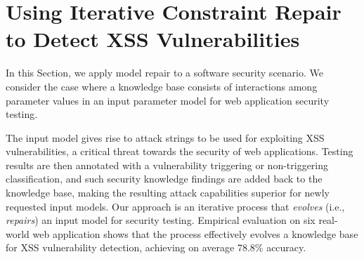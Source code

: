 \begin{tikzborder}{\cite{Gargantini16:validation}}
\begin{tikzborder}{\cite{gargantini_combinatorial_2017}}
\begin{tikzborder}{\cite{gargantini_combinatorial_2017}}
\section{Using Iterative Constraint Repair to Detect XSS Vulnerabilities}\label{sec:garn2019}

In this Section, we apply model repair to a software security scenario. 
We consider the case where a knowledge base consists of interactions among parameter values in an input parameter model for web application security testing.

The input model gives rise to attack strings to be used for exploiting XSS vulnerabilities, a critical threat towards the security of web applications.
Testing results are then annotated with a vulnerability triggering or non-triggering classification, and such security knowledge findings are added back to the knowledge base, making the resulting attack capabilities superior for newly requested input models.
Our approach is an iterative process that \textit{evolves} (i.e., \textit{repairs}) an input model for security testing.
Empirical evaluation on six real-world web application shows that the process effectively evolves a knowledge base for XSS vulnerability detection, achieving on average 78.8\% accuracy.


\end{tikzborder}
\end{tikzborder}
\end{tikzborder}
